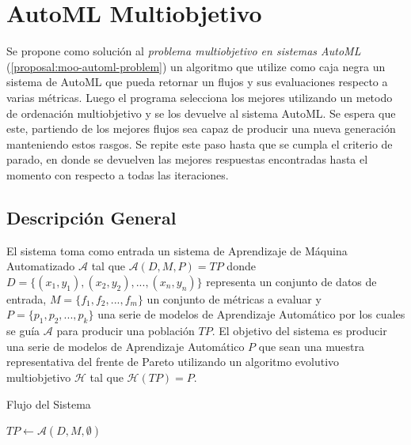 
\chapter{AutoML Multiobjetivo}\label{chapter:proposal}

Se propone como soluci\'on al  \textit{problema multiobjetivo en sistemas AutoML} (\ref{proposal:moo-automl-problem}) un algoritmo que utilize como caja negra un sistema de AutoML que pueda retornar un flujos y sus evaluaciones respecto a varias m\'etricas. Luego el programa selecciona los mejores utilizando un metodo de ordenaci\'on multiobjetivo y se los devuelve al sistema AutoML. Se espera que este, partiendo de los mejores flujos sea capaz de producir una nueva generaci\'on manteniendo estos rasgos. Se repite este paso hasta que se cumpla el criterio de parado, en donde se devuelven las mejores respuestas encontradas hasta el momento con respecto a todas las iteraciones.

\section{Descripci\'on General}
El sistema toma como entrada un sistema de Aprendizaje de M\'aquina Automatizado $\mathcal{A}$ tal que $\mathcal{A}(D, M, P) = TP$ donde $D = \{(x_1, y_1), (x_2, y_2), ..., (x_n, y_n)\}$ representa un conjunto de datos de entrada, $M = \{f_1, f_2, ..., f_m\}$ un conjunto de m\'etricas a evaluar y $P = \{p_1, p_2, ..., p_k\}$ una serie de modelos de Aprendizaje Autom\'atico por los cuales se gu\'ia $\mathcal{A}$ para producir una poblaci\'on $TP$. El objetivo del sistema es producir una serie de modelos de Aprendizaje Autom\'atico $P$ que sean una muestra representativa del frente de Pareto utilizando un algoritmo evolutivo multiobjetivo  $\mathcal{H}$ tal que $\mathcal{H}(TP) = P$. 

\begin{algorithm}[H]\caption{Flujo del Sistema}
    
    $TP \gets \mathcal{A}(D, M, \emptyset)$ 
\end{algorithm}

